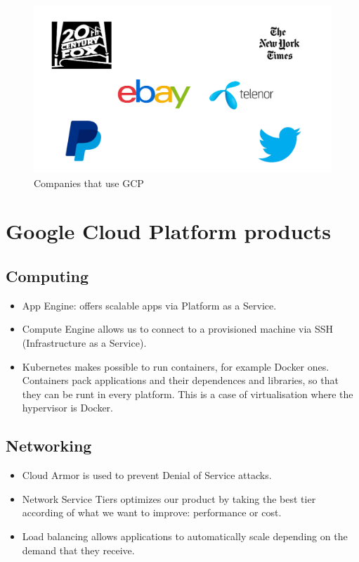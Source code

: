 \documentclass[12pt,english]{article}
\begin{document}
\begin{figure}[H]
  \centering
  \includegraphics[scale = 0.5]{../img/logos}
  \caption{Companies that use GCP}
\end{figure}

\section{Google Cloud Platform products}

\subsection{Computing}

\begin{itemize}
 \item App Engine: offers scalable apps via Platform as a Service.
 \item Compute Engine allows us to connect to a provisioned machine via SSH (Infrastructure as a Service).
 \item Kubernetes makes possible to run containers, for example Docker ones. Containers pack applications and their dependences and libraries, so that they can be runt in every platform. This is a case of virtualisation where the hypervisor is Docker.
\end{itemize}

\subsection{Networking}

\begin{itemize}
  \item Cloud Armor is used to prevent Denial of Service attacks.
  \item Network Service Tiers optimizes our product by taking the best tier according of what we want to improve: performance or cost.
  \item Load balancing allows applications to automatically scale depending on the demand that they receive.
\end{itemize}
\end{document}
